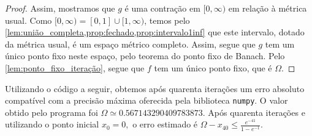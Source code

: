 \begin{proof}
    Assim, mostramos que \(g\) é uma contração em \([0, \infty)\) em relação à métrica usual. Como \([0, \infty) = [0,1]\cup[1, \infty)\), temos pelo \cref{lem:união_completa,prop:fechado,prop:intervalo1inf} que este intervalo, dotado da métrica usual, é um espaço métrico completo. Assim, segue que \(g\) tem um único ponto fixo neste espaço, pelo teorema do ponto fixo de Banach. Pelo \cref{lem:ponto_fixo_iteração}, segue que \(f\) tem um único ponto fixo, que é \(\Omega\).
\end{proof}

Utilizando o código a seguir, obtemos após quarenta iterações um erro absoluto compatível com a precisão máxima oferecida pela biblioteca \verb|numpy|. O valor obtido pelo programa foi \(\Omega \simeq0.567143290409783873\). Após quarenta iterações e utilizando o ponto inicial \(x_0 = 0,\) o erro estimado é \(\Omega - x_{40} \leq \frac{e^{-41}}{1 - e^{-1}}.\)
\begin{listing}[htbp]
    \inputminted[linenos]{Python}{exercício10.py}
\end{listing}
